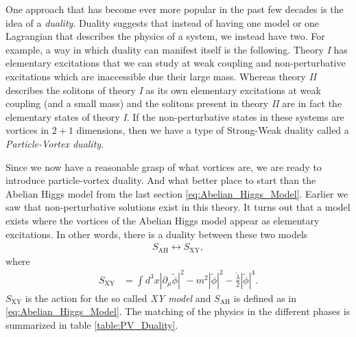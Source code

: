     One approach that has become ever more popular in the past few decades is the idea of a \textit{duality}. Duality suggests that instead of having one model or one Lagrangian that describes the physics of a system, we instead have two. For example, a way in which duality can manifest itself is the following. Theory \textit{I} has elementary excitations that we can study at weak coupling and non-perturbative excitations which are inaccessible due their large mass. Whereas theory \textit{II} describes the solitons of theory \textit{I} as its own elementary excitations at weak coupling (and a small mass) and the solitons present in theory \textit{II} are in fact the elementary states of theory \textit{I}. If the non-perturbative states in these systems are vortices in $2+1$ dimensions, then we have a type of Strong-Weak duality called a \textit{Particle-Vortex duality}. 

    Since we now have a reasonable grasp of what vortices are, we are ready to introduce particle-vortex duality. And what better place to start than the Abelian Higgs model from the last section \eqref{eq:Abelian_Higgs_Model}. Earlier we saw that non-perturbative solutions exist in this theory. It turns out that a model exists where the vortices of the Abelian Higgs model appear as elementary excitations. In other words, there is a duality between these two models
    \begin{align}
        S_{\text{AH}} \longleftrightarrow S_{\text{XY}},
    \end{align}
    where
    \begin{align}
        S_{\text{XY}} &= \int d^3x |\partial_{\mu}\tilde{\phi}|^2-m^2 |\tilde{\phi}|^2 - \frac{\tilde{\lambda}}{2} |\tilde{\phi}|^4.
    \end{align}
    $S_{\text{XY}}$ is the action for the so called \textit{XY model} and $S_{\text{AH}}$ is defined as in \eqref{eq:Abelian_Higgs_Model}. The matching of the physics in the different phases is summarized in table \eqref{table:PV_Duality}.

